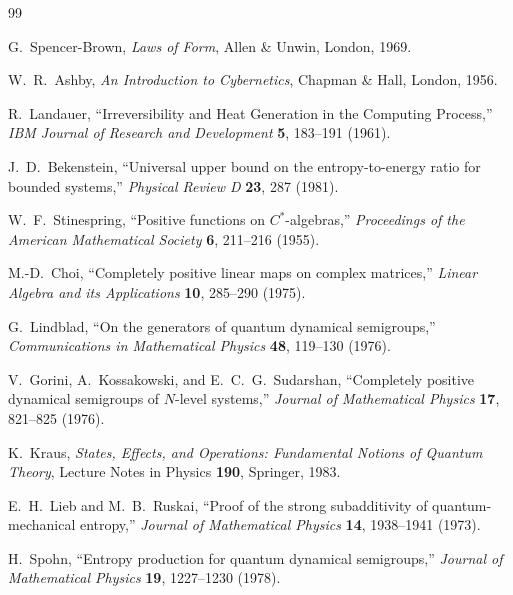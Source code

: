 \documentclass[11pt]{article}
\begin{document}
\begin{thebibliography}{99}

G.\ Spencer-Brown, \emph{Laws of Form}, Allen \& Unwin, London, 1969.

W.\ R.\ Ashby, \emph{An Introduction to Cybernetics}, Chapman \& Hall, London, 1956.

R.\ Landauer, ``Irreversibility and Heat Generation in the Computing Process,''
\emph{IBM Journal of Research and Development} \textbf{5}, 183--191 (1961).

J.\ D.\ Bekenstein, ``Universal upper bound on the entropy-to-energy ratio for bounded systems,''
\emph{Physical Review D} \textbf{23}, 287 (1981).

W.\ F.\ Stinespring, ``Positive functions on $C^*$-algebras,''
\emph{Proceedings of the American Mathematical Society} \textbf{6}, 211--216 (1955).

M.-D.\ Choi, ``Completely positive linear maps on complex matrices,''
\emph{Linear Algebra and its Applications} \textbf{10}, 285--290 (1975).

G.\ Lindblad, ``On the generators of quantum dynamical semigroups,''
\emph{Communications in Mathematical Physics} \textbf{48}, 119--130 (1976).

V.\ Gorini, A.\ Kossakowski, and E.\ C.\ G.\ Sudarshan, ``Completely positive dynamical semigroups of $N$-level systems,''
\emph{Journal of Mathematical Physics} \textbf{17}, 821--825 (1976).

K.\ Kraus, \emph{States, Effects, and Operations: Fundamental Notions of Quantum Theory}, Lecture Notes in Physics \textbf{190}, Springer, 1983.

E.\ H.\ Lieb and M.\ B.\ Ruskai, ``Proof of the strong subadditivity of quantum-mechanical entropy,''
\emph{Journal of Mathematical Physics} \textbf{14}, 1938--1941 (1973).

H.\ Spohn, ``Entropy production for quantum dynamical semigroups,''
\emph{Journal of Mathematical Physics} \textbf{19}, 1227--1230 (1978).


\end{thebibliography}
\end{document}
